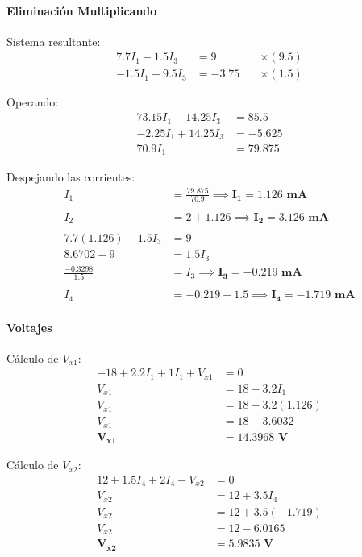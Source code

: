 \documentclass[conference]{IEEEtran}
\begin{document}
\paragraph{Eliminación Multiplicando}
Sistema resultante:
\begin{align*}
    7.7I_1 - 1.5I_3 &= 9 \quad &\times (9.5) \\
    -1.5I_1 + 9.5I_3 &= -3.75 \quad &\times (1.5)
\end{align*}

Operando:
\begin{align*}
    73.15I_1 - 14.25I_3 &= 85.5 \\
    -2.25I_1 + 14.25I_3 &= -5.625 \\
    \hline
    70.9I_1 &= 79.875
\end{align*}

Despejando las corrientes:
\begin{align*}
    I_1 &= \frac{79.875}{70.9} \implies \mathbf{I_1 = 1.126\text{ mA}} \\
    \\
    I_2 &= 2 + 1.126 \implies \mathbf{I_2 = 3.126\text{ mA}} \\
    \\
    7.7(1.126) - 1.5I_3 &= 9 \\
    8.6702 - 9 &= 1.5I_3 \\
    \frac{-0.3298}{1.5} &= I_3 \implies \mathbf{I_3 = -0.219\text{ mA}} \\
    \\
    I_4 &= -0.219 - 1.5 \implies \mathbf{I_4 = -1.719\text{ mA}}
\end{align*}

\paragraph{Voltajes}
Cálculo de $V_{x1}$:
\begin{align*}
    -18 + 2.2I_1 + 1I_1 + V_{x1} &= 0 \\
    V_{x1} &= 18 - 3.2I_1 \\
    V_{x1} &= 18 - 3.2(1.126) \\
    V_{x1} &= 18 - 3.6032 \\
    \mathbf{V_{x1}} &\mathbf{= 14.3968\text{ V}}
\end{align*}

Cálculo de $V_{x2}$:
\begin{align*}
    12 + 1.5I_4 + 2I_4 - V_{x2} &= 0 \\
    V_{x2} &= 12 + 3.5I_4 \\
    V_{x2} &= 12 + 3.5(-1.719) \\
    V_{x2} &= 12 - 6.0165 \\
    \mathbf{V_{x2}} &\mathbf{= 5.9835\text{ V}}
\end{align*}
\end{document}
